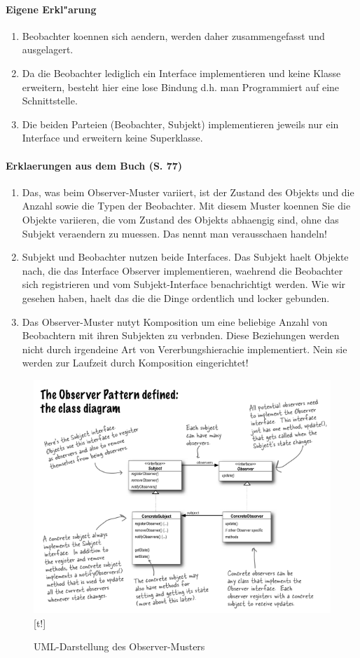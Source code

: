 \paragraph{Eigene Erkl"arung}
\begin{enumerate}
\item Beobachter koennen sich aendern, werden daher zusammengefasst und ausgelagert.
\item Da die Beobachter lediglich ein Interface implementieren und keine Klasse erweitern, besteht 
   hier eine lose Bindung d.h. man Programmiert auf eine Schnittstelle.
\item Die beiden Parteien (Beobachter, Subjekt) implementieren jeweils nur ein Interface und 
   erweitern keine Superklasse.
\end{enumerate}
   
\paragraph{Erklaerungen aus dem Buch (S. 77)}
\begin{enumerate}
\item Das, was beim Observer-Muster variiert, ist der Zustand des Objekts und die Anzahl sowie die 
   Typen der Beobachter. Mit diesem Muster koennen Sie die Objekte variieren, die vom Zustand des 
   Objekts abhaengig sind, ohne das Subjekt veraendern zu muessen. Das nennt man verausschaen 
   handeln!
\item Subjekt und Beobachter nutzen beide Interfaces. Das Subjekt haelt Objekte nach, die das 
   Interface Observer implementieren, waehrend die Beobachter sich registrieren und vom 
   Subjekt-Interface benachrichtigt werden. Wie wir gesehen haben, haelt das die die Dinge 
   ordentlich und locker gebunden. 
\item Das Observer-Muster nutyt Komposition um eine beliebige Anzahl von Beobachtern mit ihren 
   Subjekten zu verbnden. Diese Beziehungen werden nicht durch irgendeine Art von 
   Vererbungshierachie implementiert. Nein sie werden zur Laufzeit durch Komposition eingerichtet!
\end{enumerate}

\begin{figure}
	\centering
	\includegraphics{observer/img/observerUML} [t!]
	\caption{UML-Darstellung des Observer-Musters}
	\label{fig:observerUML}
\end{figure}

